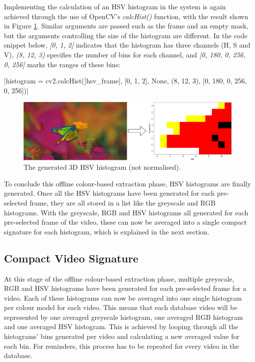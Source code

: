Implementing the calculation of an HSV histogram in the system is again achieved through the use of OpenCV's \textit{calcHist()} function, with the result shown in Figure \ref{fig:implementation-hsv_not_normalised}. Similar arguments are passed such as the frame and an empty mask, but the arguments controlling the size of the histogram are different. In the code snippet below, \textit{[0, 1, 2]} indicates that the histogram has three channels (H, S and V), \textit{(8, 12, 3)} specifies the number of bins for each channel, and \textit{[0, 180, 0, 256, 0, 256]} marks the ranges of these bins:

|histogram = cv2.calcHist([hsv_frame], [0, 1, 2], None, (8, 12, 3), [0, 180, 0, 256, 0, 256])|

\begin{figure}[h] 
\centerline{\includegraphics[width=\textwidth]{figures/implementation/hsv_not_normalised.png}}
\caption{\label{fig:implementation-hsv_not_normalised}The generated 3D HSV histogram (not normalised).}
\end{figure}

To conclude this offline colour-based extraction phase, HSV histograms are finally generated. Once all the HSV histograms have been generated for each pre-selected frame, they are all stored in a list like the greyscale and RGB histograms. With the greyscale, RGB and HSV histograms all generated for each pre-selected frame of the video, these can now be averaged into a single compact signature for each histogram, which is explained in the next section.


\subsection{Compact Video Signature}
\label{sec:implementation-compact-video-signature}

At this stage of the offline colour-based extraction phase, multiple greyscale, RGB and HSV histograms have been generated for each pre-selected frame for a video. Each of these histograms can now be averaged into one single histogram per colour model for each video. This means that each database video will be represented by one averaged greyscale histogram, one averaged RGB histogram and one averaged HSV histogram. This is achieved by looping through all the histograms' bins generated per video and calculating a new averaged value for each bin. For reminders, this process has to be repeated for every video in the database.\\

